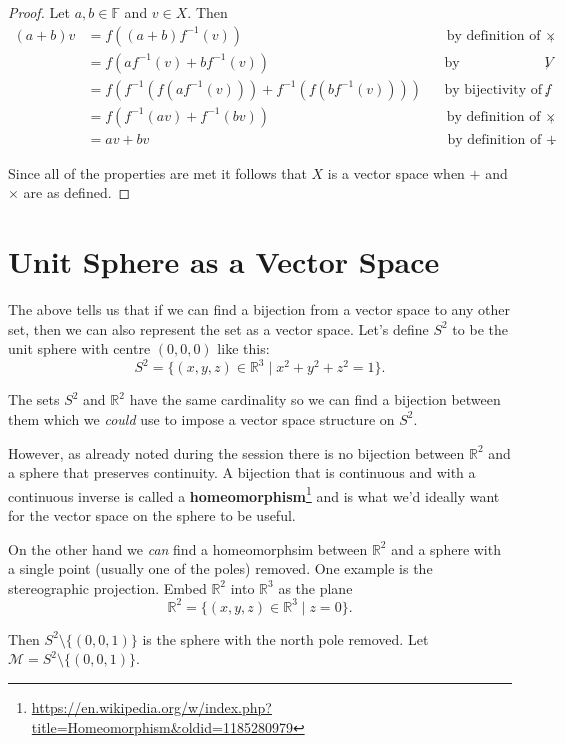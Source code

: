\documentclass[10pt, a4paper]{article}
\newcommand{\defn}[1]{\textbf{\textsf{#1}}}
\def\R{\mathbb{R}}
\def\F{\mathbb{F}}
\def\setsep{\mid}
\def\f{f}
\def\finv{f^{-1}}
\theoremstyle{break}
\begin{document}
\begin{proof}
Let $a, b \in \F$ and $v \in X$. Then
\begin{align*}
(a + b) v & = \f((a + b) \finv(v)) && \text{by definition of $\times$}, \\
          & = \f( a \finv(v) + b \finv(v)) && \text{by distributivity in $V$}, \\
          & = \f( \finv( \f(a \finv(v))) + \finv( \f( b \finv(v)))) && \text{by bijectivity of $\f$}, \\
          & = \f( \finv(av) + \finv(bv)) && \text{by definition of $\times$}, \\
          & = av + bv && \text{by definition of $+$}.
\end{align*}

Since all of the properties are met it follows that $X$ is a vector space when $+$ and $\times$ are as defined.
\end{proof}

\section*{Unit Sphere as a Vector Space}

The above tells us that if we can find a bijection from a vector space to any other set, then we can also represent the set as a vector space. Let's define $S^2$ to be the unit sphere with centre $(0, 0, 0)$ like this:
$$
S^2 = \{ (x, y, z) \in \R^3 \setsep x^2 + y^2 + z^2 = 1 \}.
$$

The sets $S^2$ and $\R^2$ have the same cardinality so we can find a bijection between them which we {\it could\/} use to impose a vector space structure on $S^2$.

However, as already noted during the session there is no bijection between $\R^2$ and a sphere that preserves continuity. A bijection that is continuous and with a continuous inverse is called a \defn{homeomorphism}\footnote[1]{\url{https://en.wikipedia.org/w/index.php?title=Homeomorphism&oldid=1185280979}} and is what we'd ideally want for the vector space on the sphere to be useful.

On the other hand we {\it can\/} find a homeomorphsim between $\R^2$ and a sphere with a single point (usually one of the poles) removed. One example is the stereographic projection. Embed $\R^2$ into $\R^3$ as the plane
$$
\R^2 = \{ (x, y, z) \in \R^3 \setsep z = 0 \}.
$$

Then $S^2 \setminus \{ (0, 0, 1) \}$ is the sphere with the north pole removed. Let $\mathscr{M} = S^2 \setminus \{ (0, 0, 1) \}$.
\end{document}
